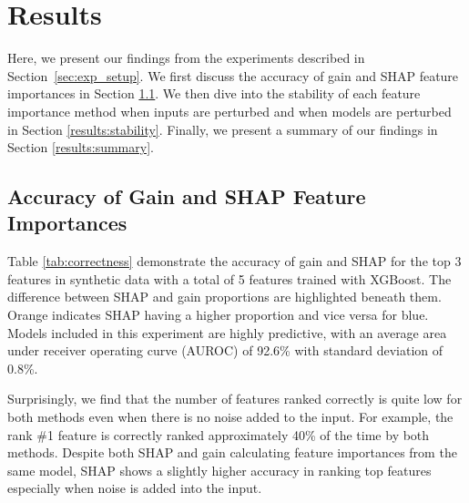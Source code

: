 \vspace{-.3cm}
\section{Results} \label{sec:results}
\vspace{-.3cm}
Here, we present our findings from the experiments described in Section~\ref{sec:exp_setup}. We first discuss the accuracy of gain and SHAP feature importances in Section \ref{results:accuracy}. We then dive into the stability of each feature importance method when inputs are perturbed and when models are perturbed in Section \ref{results:stability}. Finally, we present a summary of our findings in Section \ref{results:summary}.

\vspace{-.3cm}
\subsection{Accuracy of Gain and SHAP Feature Importances}
\label{results:accuracy}
Table \ref{tab:correctness} demonstrate the accuracy of gain and SHAP for the top 3 features in synthetic data with a total of 5 features trained with XGBoost. The difference between SHAP and gain proportions are  highlighted beneath them. Orange indicates SHAP having a higher proportion and vice versa for blue. Models included in this experiment are highly predictive, with an average area under receiver operating curve (AUROC) of 92.6\% with standard deviation of 0.8\%.

Surprisingly, we find that the number of features ranked correctly is quite low for both methods even when there is no noise added to the input. For example, the rank \#1  feature is correctly ranked approximately 40\% of the time by both methods. Despite both SHAP and gain calculating feature importances from the same model, SHAP shows a slightly higher accuracy in ranking top features especially when noise is added into the input.

